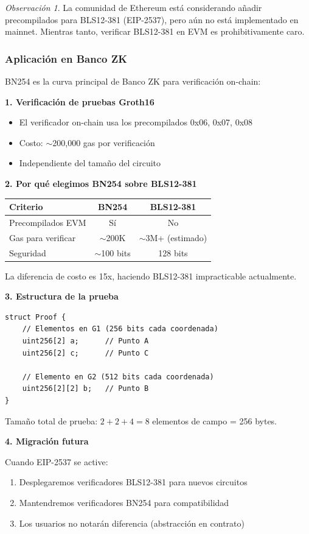 \documentclass[11pt,a4paper,twoside,openright]{book}
\theoremstyle{definition}
\theoremstyle{plain}
\theoremstyle{remark}
\newtheorem{remark}{Observación}[chapter]
\begin{document}
\begin{remark}
La comunidad de Ethereum está considerando añadir precompilados para BLS12-381 (EIP-2537), pero aún no está implementado en mainnet. Mientras tanto, verificar BLS12-381 en EVM es prohibitivamente caro.
\end{remark}

\subsubsection{Aplicación en Banco ZK}

\begin{bancozk}
BN254 es la curva principal de Banco ZK para verificación on-chain:

\textbf{1. Verificación de pruebas Groth16}
\begin{itemize}
    \item El verificador on-chain usa los precompilados 0x06, 0x07, 0x08
    \item Costo: $\sim$200,000 gas por verificación
    \item Independiente del tamaño del circuito
\end{itemize}

\textbf{2. Por qué elegimos BN254 sobre BLS12-381}
\begin{center}
\begin{tabular}{lcc}
\toprule
\textbf{Criterio} & \textbf{BN254} & \textbf{BLS12-381} \\
\midrule
Precompilados EVM & Sí & No \\
Gas para verificar & $\sim$200K & $\sim$3M+ (estimado) \\
Seguridad & $\sim$100 bits & 128 bits \\
\bottomrule
\end{tabular}
\end{center}

La diferencia de costo es 15x, haciendo BLS12-381 impracticable actualmente.

\textbf{3. Estructura de la prueba}
\begin{verbatim}
struct Proof {
    // Elementos en G1 (256 bits cada coordenada)
    uint256[2] a;      // Punto A
    uint256[2] c;      // Punto C
    
    // Elemento en G2 (512 bits cada coordenada)
    uint256[2][2] b;   // Punto B
}
\end{verbatim}

Tamaño total de prueba: $2 + 2 + 4 = 8$ elementos de campo = 256 bytes.

\textbf{4. Migración futura}

Cuando EIP-2537 se active:
\begin{enumerate}
    \item Desplegaremos verificadores BLS12-381 para nuevos circuitos
    \item Mantendremos verificadores BN254 para compatibilidad
    \item Los usuarios no notarán diferencia (abstracción en contrato)
\end{enumerate}
\end{bancozk}
\end{document}
